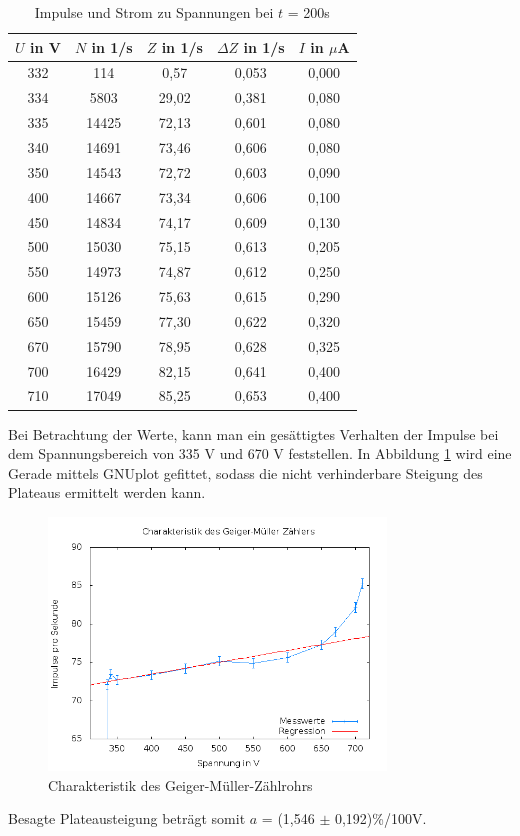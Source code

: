 \begin{table}[H]
 \begin{tabular}{c|c|c|c|c}
 $U$ in V & $N$ in 1/s & $Z$ in 1/s & $\Delta Z$ in 1/s & $I$ in $\mu$A \\
 \hline 
  332&	114	&0,57&	0,053&	0,000 \\
334&	5803	&29,02&	0,381&	0,080\\
335&	14425&	72,13&	0,601&	0,080\\
340&	14691&	73,46&	0,606&	0,080\\
350&	14543&	72,72&	0,603&	0,090\\
400&	14667&	73,34&	0,606&	0,100\\
450&	14834&	74,17&	0,609&	0,130\\
500&	15030&	75,15&	0,613&	0,205\\
550&	14973&	74,87&	0,612&	0,250\\
600&	15126&	75,63&	0,615&	0,290\\
650&	15459&	77,30&	0,622&	0,320\\
670&	15790&	78,95&	0,628&	0,325\\
700&	16429&	82,15&	0,641&	0,400\\
710&	17049&	85,25&	0,653 &	0,400\\
 \end{tabular}
\caption{Impulse und Strom zu Spannungen bei $t$ = 200s}
\label{tab_charakteristik}
 \end{table}

Bei Betrachtung der Werte, kann man ein gesättigtes Verhalten der Impulse bei dem Spannungsbereich von 335 V und 670 V feststellen. In
Abbildung \ref{pic_plateau} wird eine Gerade mittels GNUplot gefittet, sodass die nicht verhinderbare Steigung des Plateaus ermittelt
werden kann. 

\begin{figure}[H]
 \includegraphics[width=0.8\textwidth]{pics/charakteristik.png}
 \caption{Charakteristik des Geiger-Müller-Zählrohrs}
 \label{pic_plateau}
\end{figure}
Besagte Plateausteigung beträgt somit $a$ = (1,546 $\pm$ 0,192)\%/100V.  

